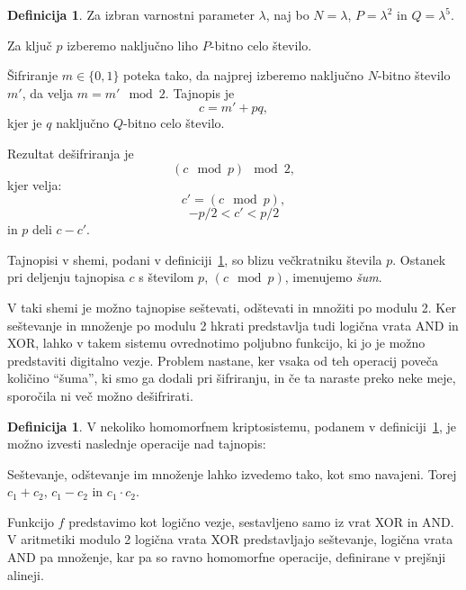 \documentclass[12pt,a4paper,openany,tikz]{book}
\theoremstyle{plain}
\theoremstyle{definition}
\newtheorem{defn}[thm]{Definicija} %
\begin{document}
\begin{mdframed}[frametitle=Nekoliko homomorfen kriptosistem]
  \begin{defn} Za izbran varnostni parameter $\lambda$, naj bo $N=\lambda$, $P=\lambda^2$ in $Q=\lambda^5$.
    \begin{description}[style=nextline]
      \item[Generiranje ključa - \texttt{KeyGen}]Za ključ $p$ izberemo naključno liho $P$-bitno celo število.
      \item[Šifriranje - $e_k(m)$]Šifriranje $m \in {\{}0,1{\}}$ poteka tako, da najprej izberemo naključno $N$-bitno število $m'$, da velja $m = m' \mod 2$. Tajnopis je $$c=m'+pq,$$ kjer je $q$ naključno $Q$-bitno celo število.
      \item[Dešifriranje - $d_k(m)$]Rezultat dešifriranja je $$(c \mod p) \mod 2,$$ kjer velja: $$c'=(c \mod p),$$ $$-p/2 < c' < p/2$$ in $p$ deli $c-c'$.
    \end{description}
    \label{def:swhe}
  \end{defn}
\end{mdframed}

Tajnopisi v shemi, podani v definiciji~\ref{def:swhe}, so blizu večkratniku števila $p$. Ostanek pri deljenju tajnopisa $c$ s številom $p$, $(c \mod p)$, imenujemo \textit{šum}.

V taki shemi je možno tajnopise seštevati, odštevati in množiti po modulu 2. Ker seštevanje in množenje po modulu 2 hkrati predstavlja tudi logična vrata \rm{AND} in \rm{XOR}, lahko v takem sistemu ovrednotimo poljubno funkcijo, ki jo je možno predstaviti digitalno vezje. Problem nastane, ker vsaka od teh operacij poveča količino ``šuma'', ki smo ga dodali pri šifriranju, in če ta naraste preko neke meje, sporočila ni več možno dešifrirati.

\begin{mdframed}[frametitle=Homomorfne operacije]
  \begin{defn} V nekoliko homomorfnem kriptosistemu, podanem v definiciji~\ref{def:swhe}, je možno izvesti naslednje operacije nad tajnopis:
    \begin{description}[style=nextline]
      \item[Operacije - \texttt{Add}($c_1$, $c_2$), \texttt{Sub}($c_1$, $c_2$), \texttt{Mult}($c_1$, $c_2$)]Seštevanje, odštevanje im množenje lahko izvedemo tako, kot smo navajeni. Torej $c_1+c_2$, $c_1-c_2$ in $c_1 \cdot c_2$.
      \item[Ovrednotenje - $\texttt{Evaluate}(f, c_1, \ldots, c_t)$] Funkcijo $f$ predstavimo kot logično vezje, sestavljeno samo iz vrat \rm{XOR} in \rm{AND}. V aritmetiki modulo 2 logična vrata \rm{XOR} predstavljajo seštevanje, logična vrata \rm{AND} pa množenje, kar pa so ravno homomorfne operacije, definirane v prejšnji alineji.
    \end{description}
    \label{def:swheops}
  \end{defn}
\end{mdframed}
\end{document}
